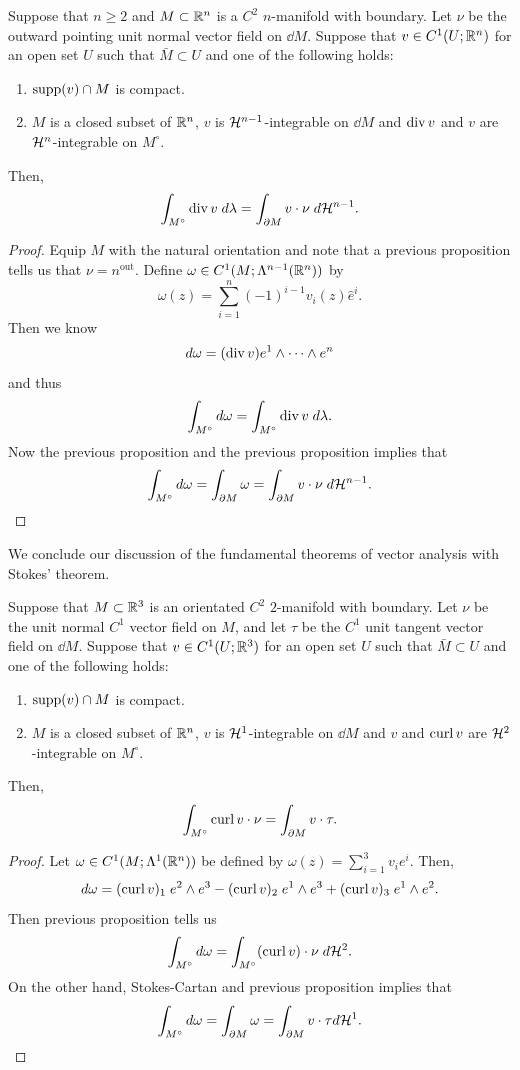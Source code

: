 \documentclass[a4paper]{article}
\begin{document}
\begin{thm}
Suppose that $n \geq 2$ and $M \subset \mathbb{R}^n$ is a $C^2$ 
$n$-manifold with boundary. Let $\nu$ be the outward pointing 
unit normal vector field on $\dd M$. Suppose that 
$v \in C^1(U ; \mathbb{R}^n)$ for an open set $U$ such that 
$\bar{M} \subset U$ and one of the following holds: 
\begin{enumerate}
\item $\operatorname{supp}(v) \cap M$ is compact.
\item $M$ is a closed subset of $\mathbb{R}^n$, $v$ is 
$\mathcal{H}^{n-1}$-integrable on $\dd M$ and $\operatorname{div} v$ and $v$ 
are $\mathcal{H}^n$-integrable on $M^\circ$.
\end{enumerate}
Then, 
\[
\int_{M^\circ} \operatorname{div} v \; d \lambda = \int_{\partial M} 
v \cdot \nu \; d \mathcal{H}^{n-1}.
\]
\end{thm}

\begin{proof}
Equip $M$ with the natural orientation and note that a previous 
proposition tells us that $\nu = n^{\text{out}}$. Define 
$\omega \in C^1 (M ; \Lambda^{n-1} (\mathbb{R}^n))$ by 
\[
\omega(z) = \sum_{i=1}^n (-1)^{i-1} v_i(z) \hat{e}^i.
\]
Then we know 
\[
d \omega = (\operatorname{div} v) e^1 \wedge \dots \wedge e^n
\]
and thus 
\[
\int_{M^\circ} d \omega = \int_{M^\circ} \operatorname{div} 
v \; d \lambda.
\]
Now the previous proposition and the previous proposition
implies that 
\[
\int_{M^\circ} d \omega = \int_{\partial M} \omega
= \int_{\partial M} v \cdot \nu \; d \mathcal{H}^{n-1}.
\]
\end{proof}

We conclude our discussion of the fundamental theorems of 
vector analysis with Stokes' theorem.

\begin{thm}
Suppose that $M \subset \mathbb{R}^3$ is an orientated $C^2$ 
$2$-manifold with boundary. Let $\nu$ be the unit normal 
$C^1$ vector field on $M$, and let $\tau$ be the $C^1$
unit tangent vector field on $\dd M$. Suppose that 
$v \in C^1(U; \mathbb{R}^3)$ for an open set $U$ such that $\bar{M}
\subset U$ and one of the following holds: 
\begin{enumerate}
\item $\operatorname{supp}(v) \cap M$ is compact.
\item $M$ is a closed subset of $\mathbb{R}^n$, $v$ is $\mathcal{H}^1$-integrable
on $\dd M$ and $v$ and $\operatorname{curl} v$ are $\mathcal{H}^2$-integrable
on $M^\circ$.
\end{enumerate} 
Then, 
\[
\int_{M^\circ} \operatorname{curl} v \cdot \nu = \int_{\partial M} v \cdot \tau.
\]
\end{thm}

\begin{proof}
Let $\omega \in C^1(M; \Lambda^1(\mathbb{R}^n))$ be defined by 
$\omega(z) = \sum_{i=1}^3 v_i e^i$. Then, 
\[
d \omega = (\operatorname{curl} v)_1 \; e^2 \wedge e^3 
- (\operatorname{curl} v)_2 \; e^1 \wedge e^3 
+ (\operatorname{curl} v)_3 \; e^1 \wedge e^2.
\]
Then previous proposition tells us
\[
\int_{M^\circ} d \omega 
= \int_{M^\circ} (\operatorname{curl} v) \cdot \nu \; d \mathcal{H}^2.
\]
On the other hand, Stokes-Cartan and previous proposition
implies that 
\[
\int_{M^\circ} d \omega = \int_{\partial M} \omega
= \int_{\partial M} v \cdot \tau d \mathcal{H}^1.
\]
\end{proof}
\end{document}
